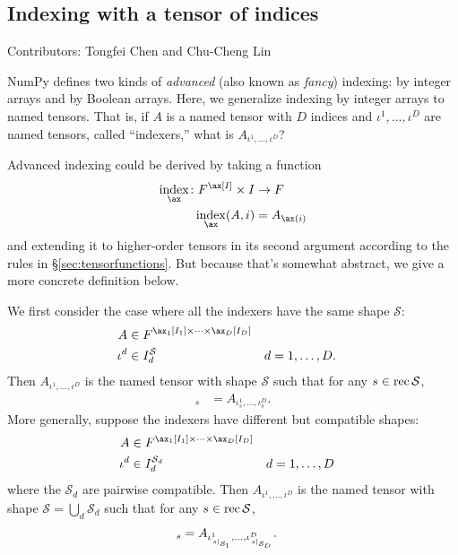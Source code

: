 \subsection{Indexing with a tensor of indices}

Contributors: Tongfei Chen and Chu-Cheng Lin

NumPy defines two kinds of \emph{advanced} (also known as \emph{fancy}) indexing: by integer arrays and by Boolean arrays. Here, we generalize indexing by integer arrays to named tensors. That is, if $A$ is a named tensor with $D$ indices and $\iota^1, \ldots, \iota^D$ are named tensors, called ``indexers,'' what is $A_{\iota^1, \ldots, \iota^D}$?

Advanced indexing could be derived by taking a function
\begin{align*}
  \nfun{\ax}{index} \colon F^{\ax[I]} \times I &\rightarrow F \\
  \nfun{\ax}{index}(A, i) &= A_{\ax(i)}
\end{align*}
and extending it to higher-order tensors in its second argument according to the rules in \S\ref{sec:tensorfunctions}. But because that's somewhat abstract, we give a more concrete definition below.

We first consider the case where all the indexers have the same shape $\mathcal{S}$:
\begin{align*}
  A &\in F^{\ax_1[I_1] \times \cdots \times \ax_D[I_D]} \\
  \iota^d &\in I_d^{\mathcal{S}} & d &= 1, \ldots, D.
\end{align*}
Then $A_{\iota^1, \ldots, \iota^D}$ is the named tensor with shape $\mathcal{S}$ such that for any $s \in \operatorname{rec}{\mathcal{S}}$,
\begin{align*}
  [A_{\iota^1, \ldots, \iota^D}]_s &= A_{\iota^1_s, \ldots, \iota^D_s}.
\end{align*}
More generally, suppose the indexers have different but compatible shapes:
\begin{align*}
  A &\in F^{\ax_1[I_1] \times \cdots \times \ax_D[I_D]} \\
  \iota^d &\in I_d^{\mathcal{S}_d} & d &= 1, \ldots, D
\end{align*}
where the $\mathcal{S}_d$ are pairwise compatible. Then $A_{\iota^1, \ldots, \iota^D}$ is the named tensor with shape $\mathcal{S} = \bigcup_d \mathcal{S}_d$ such that for any $s \in \operatorname{rec}{\mathcal{S}}$,
\begin{align*}
  [A_{\iota^1, \ldots, \iota^D}]_s &= A_{\iota^1_{\restrict{s}{\mathcal{S}_1}}, \ldots, \iota^D_{\restrict{s}{\mathcal{S}_D}}}.
\end{align*}

